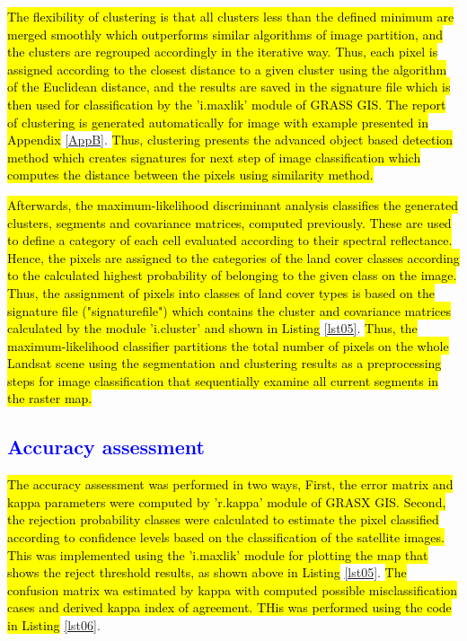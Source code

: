 \documentclass[sustainability,article,submit,pdftex,moreauthors]{Definitions/mdpi}
\begin{document}
\hl{The flexibility of clustering is that all clusters less than the defined minimum are merged smoothly which outperforms similar algorithms of image partition, and the clusters are regrouped accordingly in the iterative way. Thus, each pixel is assigned according to the closest distance to a given cluster using the algorithm of the Euclidean distance, and the results are saved in the signature file which is then used for classification by the 'i.maxlik' module of GRASS GIS. The report of clustering is generated automatically for image with example presented in Appendix }\ref{AppB}. \hl{Thus, clustering presents the advanced object based detection method which creates signatures for next step of image classification which computes the distance between the pixels using similarity method.}

\hl{Afterwards, the maximum-likelihood discriminant analysis classifies the generated clusters, segments and covariance matrices, computed previously. These are used to define a category of each cell evaluated according to their spectral reflectance. Hence, the pixels are assigned to the categories of the land cover classes according to the calculated highest probability of belonging to the given class on the image. Thus, the assignment of pixels into classes of land cover types is based on the signature file ("signaturefile") which contains the cluster and covariance matrices calculated by the module 'i.cluster' and shown in Listing }\ref{lst05}. \hl{Thus, the maximum-likelihood classifier partitions the total number of pixels on the whole Landsat scene using the segmentation and clustering results as a preprocessing steps for image classification that sequentially examine all current segments in the raster map.}

\subsection{\textcolor{blue}{Accuracy assessment}}

\hl{The accuracy assessment was performed in two ways, First, the error matrix and kappa parameters were computed by 'r.kappa' module of GRASX GIS. Second, the rejection probability classes were calculated to estimate the pixel classified according to confidence levels based on the classification of the satellite images. This was implemented using the 'i.maxlik' module for plotting the map that shows the reject threshold results, as shown above in Listing} \ref{lst05}. \hl{The confusion matrix wa estimated by kappa with computed possible misclassification cases and derived kappa index of agreement. THis was performed using the code in Listing }\ref{lst06}.
\end{document}
